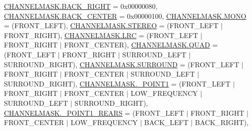 \begin{DoxyCompactItemize}
\hyperlink{namespace_f_m_o_d_ae295945ff00acb5f2e5ef0b3f217f5e2a7e77482f99baeaa96a02f36b2f99f387}{C\+H\+A\+N\+N\+E\+L\+M\+A\+S\+K.\+B\+A\+C\+K\+\_\+\+R\+I\+G\+HT} = 0x00000080, 
\newline
\hyperlink{namespace_f_m_o_d_ae295945ff00acb5f2e5ef0b3f217f5e2a9f4612113fce51e31aba5362878a779a}{C\+H\+A\+N\+N\+E\+L\+M\+A\+S\+K.\+B\+A\+C\+K\+\_\+\+C\+E\+N\+T\+ER} = 0x00000100, 
\hyperlink{namespace_f_m_o_d_ae295945ff00acb5f2e5ef0b3f217f5e2af5f75f1b95652443e4398974b82c3f7c}{C\+H\+A\+N\+N\+E\+L\+M\+A\+S\+K.\+M\+O\+NO} = (F\+R\+O\+N\+T\+\_\+\+L\+E\+FT), 
\hyperlink{namespace_f_m_o_d_ae295945ff00acb5f2e5ef0b3f217f5e2a830dff3c27992cca35a4b46282e10530}{C\+H\+A\+N\+N\+E\+L\+M\+A\+S\+K.\+S\+T\+E\+R\+EO} = (F\+R\+O\+N\+T\+\_\+\+L\+E\+FT $\vert$ F\+R\+O\+N\+T\+\_\+\+R\+I\+G\+HT), 
\hyperlink{namespace_f_m_o_d_ae295945ff00acb5f2e5ef0b3f217f5e2a261fdbdd0135cfead1820d6ac05e4492}{C\+H\+A\+N\+N\+E\+L\+M\+A\+S\+K.\+L\+RC} = (F\+R\+O\+N\+T\+\_\+\+L\+E\+FT $\vert$ F\+R\+O\+N\+T\+\_\+\+R\+I\+G\+HT $\vert$ F\+R\+O\+N\+T\+\_\+\+C\+E\+N\+T\+ER), 
\newline
\hyperlink{namespace_f_m_o_d_ae295945ff00acb5f2e5ef0b3f217f5e2ac88da92039291f825814816096db2ea2}{C\+H\+A\+N\+N\+E\+L\+M\+A\+S\+K.\+Q\+U\+AD} = (F\+R\+O\+N\+T\+\_\+\+L\+E\+FT $\vert$ F\+R\+O\+N\+T\+\_\+\+R\+I\+G\+HT $\vert$ S\+U\+R\+R\+O\+U\+N\+D\+\_\+\+L\+E\+FT $\vert$ S\+U\+R\+R\+O\+U\+N\+D\+\_\+\+R\+I\+G\+HT), 
\hyperlink{namespace_f_m_o_d_ae295945ff00acb5f2e5ef0b3f217f5e2a866463fc14574fb21e0ef38a9057f317}{C\+H\+A\+N\+N\+E\+L\+M\+A\+S\+K.\+S\+U\+R\+R\+O\+U\+ND} = (F\+R\+O\+N\+T\+\_\+\+L\+E\+FT $\vert$ F\+R\+O\+N\+T\+\_\+\+R\+I\+G\+HT $\vert$ F\+R\+O\+N\+T\+\_\+\+C\+E\+N\+T\+ER $\vert$ S\+U\+R\+R\+O\+U\+N\+D\+\_\+\+L\+E\+FT $\vert$ S\+U\+R\+R\+O\+U\+N\+D\+\_\+\+R\+I\+G\+HT), 
\hyperlink{namespace_f_m_o_d_ae295945ff00acb5f2e5ef0b3f217f5e2af397534e615979fc9097fe5a78f82cb4}{C\+H\+A\+N\+N\+E\+L\+M\+A\+S\+K.\+\_\+P\+O\+I\+N\+T1} = (F\+R\+O\+N\+T\+\_\+\+L\+E\+FT $\vert$ F\+R\+O\+N\+T\+\_\+\+R\+I\+G\+HT $\vert$ F\+R\+O\+N\+T\+\_\+\+C\+E\+N\+T\+ER $\vert$ L\+O\+W\+\_\+\+F\+R\+E\+Q\+U\+E\+N\+CY $\vert$ S\+U\+R\+R\+O\+U\+N\+D\+\_\+\+L\+E\+FT $\vert$ S\+U\+R\+R\+O\+U\+N\+D\+\_\+\+R\+I\+G\+HT), 
\hyperlink{namespace_f_m_o_d_ae295945ff00acb5f2e5ef0b3f217f5e2ad7f7da8bf3f4b3220cc78e98ecfb01c0}{C\+H\+A\+N\+N\+E\+L\+M\+A\+S\+K.\+\_\+P\+O\+I\+N\+T1\+\_\+\+R\+E\+A\+RS} = (F\+R\+O\+N\+T\+\_\+\+L\+E\+FT $\vert$ F\+R\+O\+N\+T\+\_\+\+R\+I\+G\+HT $\vert$ F\+R\+O\+N\+T\+\_\+\+C\+E\+N\+T\+ER $\vert$ L\+O\+W\+\_\+\+F\+R\+E\+Q\+U\+E\+N\+CY $\vert$ B\+A\+C\+K\+\_\+\+L\+E\+FT $\vert$ B\+A\+C\+K\+\_\+\+R\+I\+G\+HT), 

\end{DoxyCompactItemize}
